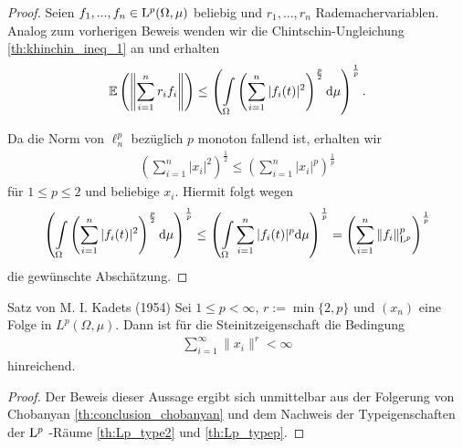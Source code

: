 \begin{proof}
Seien $ f_1,...,f_n \in \mathrm{L}^p(\Omega,\mu) $ beliebig und $ r_1,...,r_n $ Rademachervariablen.
Analog zum vorherigen Beweis wenden wir die Chintschin-Ungleichung \ref{th:khinchin_ineq_1} an und erhalten
\begin{align*}
	\mathbb{E}
	\left(
	\left\|
	\sum \limits_{i=1}^n r_i f_i
	\right\|
	\right)
	\leq
	\left(
	\int \limits_{\Omega}
	\left(
	\sum \limits_{i = 1}^n
	|f_i(t)|^2
	\right)^\frac{p}{2}
	\mathrm{d}\mu
	\right)^\frac{1}{p}.	
\end{align*}

Da die Norm von $ \ell^p_{n} $ bezüglich $ p $ monoton fallend ist, erhalten wir
\begin{align*}
	\left( \sum \limits_{i = 1}^n |x_i|^2  \right)^\frac{1}{2}
	\leq 
	\left( \sum \limits_{i = 1}^n |x_i|^p  \right)^\frac{1}{p}
\end{align*}
für $ 1 \leq p \leq 2 $ und beliebige $ x_i $. \newpage
Hiermit folgt wegen
\begin{align*}
	\left(
	\int \limits_{\Omega}
	\left(
	\sum \limits_{i = 1}^n
	|f_i(t)|^2
	\right)^\frac{p}{2}
	\mathrm{d}\mu
	\right)^\frac{1}{p}
	\leq 
	\left(
	\int \limits_{\Omega}
	\sum \limits_{i = 1}^n
	|f_i(t)|^p
	\mathrm{d}\mu
	\right)^\frac{1}{p}
	=
	\left(
	\sum \limits_{i = 1}^n
	\| f_ i\|^p_{\mathrm{L}^p}
	\right)^\frac{1}{p}
\end{align*}
die gewünschte Abschätzung.

\end{proof}


\begin{genericthm}{Satz von M. I. Kadets (1954)}\label{th:lemma_of_kadets}
	Sei $ 1 \leq p < \infty $,  $ r := \min\{2,p\} $
	und $ (x_n) $ eine Folge in $ L^p(\Omega,\mu) $.
	Dann ist für die Steinitzeigenschaft die Bedingung
	\begin{align*}
	 \sum \limits_{i=1}^\infty \|x_i \|^r < \infty 
	\end{align*}
	hinreichend.
\end{genericthm}

\begin{proof}
Der Beweis dieser Aussage ergibt sich unmittelbar aus der Folgerung von Chobanyan \ref{th:conclusion_chobanyan}
und dem Nachweis der Typeigenschaften der $ \mathrm{L}^p $ -Räume \ref{th:Lp_type2} und \ref{th:Lp_typep}.
\end{proof}




